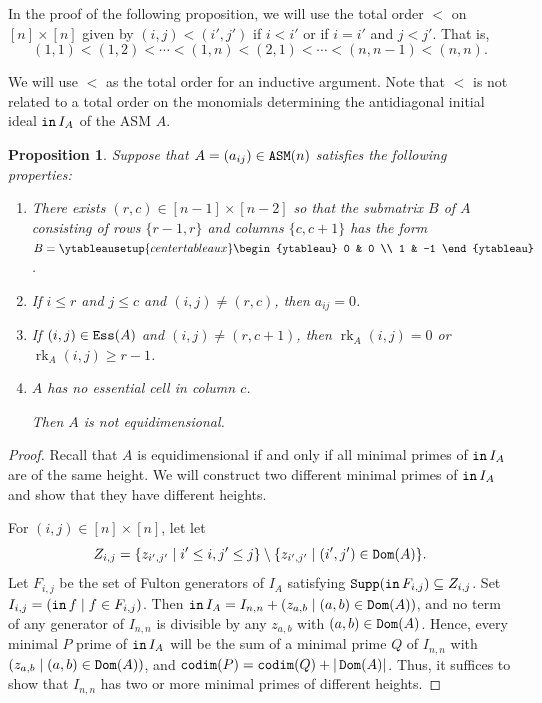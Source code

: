 \documentclass[12 pt]{amsart}
\DeclareMathOperator{\ASM}{{\tt ASM}}
\DeclareMathOperator{\init}{{\tt in}}
\DeclareMathOperator{\supp}{{\tt Supp}}
\DeclareMathOperator{\codim}{{\tt codim}}
\DeclareMathOperator{\ess}{{\tt Ess}}
\DeclareMathOperator{\Dom}{{\tt Dom}}
\DeclareMathOperator{\rk}{rk}
\theoremstyle{plain}
\newtheorem{prop}[thm]{Proposition}
\theoremstyle{definition}
\theoremstyle{remark}
\begin{document}
{In the proof of the following proposition, we will use the total order $<$ on $[n] \times [n]$ given by $(i,j) < (i',j')$ if $i < i'$ or if $i = i'$ and $j < j'$.  That is, \[
(1,1) < (1,2) < \cdots < (1,n) < (2,1) < \cdots < (n,n-1) < (n,n).
\]

We will use $<$ as the total order for an inductive argument.  Note that $<$ is not related to a total order on the monomials determining the antidiagonal initial ideal $\init I_A$ of the ASM $A$.

\begin{prop}\label{prop:not-equidimensional}
Suppose that $A = (a_{ij}) \in \ASM(n)$ satisfies the following properties:

\begin{enumerate}
    \item There exists $(r,c) \in [n-1] \times [n-2]$ so that the submatrix $B$ of $A$ consisting of rows $\{r-1,r\}$ and columns $\{c,c+1\}$ has the form $B = \ytableausetup{centertableaux}
\begin{ytableau}
 0 & 0 \\
1 & -1
\end{ytableau}$.
    
    \item  If $i \leq r$ and $j \leq c$ and $(i,j) \neq (r,c)$, then $a_{ij} = 0$.
    
    \item If $(i,j) \in \ess(A)$ and $(i,j) \neq (r,c+1)$, then $\rk_A(i,j) = 0$ or $\rk_A(i,j) \geq r-1$.
    
    \item $A$ has no essential cell in column $c$.
    
Then $A$ is not equidimensional.
\end{enumerate}
\label{prop:badblock}
\end{prop}

\begin{proof}
Recall that $A$ is equidimensional if and only if all minimal primes of $\init I_A$ are of the same height.  We will construct two different minimal primes of $\init I_A$ and show that they have different heights.

For $(i,j) \in [n] \times [n]$, let let \[
Z_{i,j} = \{z_{i',j'} \mid i' \leq i, j' \leq j\} \setminus \{z_{i',j'} \mid (i',j')\in \Dom(A)\}.
\] Let $F_{i,j}$ be the set of Fulton generators of $I_A$ satisfying $\supp(\init F_{i,j}) \subseteq Z_{i,j}$.  Set $I_{i,j} = (\init f \mid f \in F_{i,j})$. 
Then $\init I_A = I_{n,n}+(z_{a,b} \mid (a,b) \in \Dom(A))$, and no term of any generator of $I_{n,n}$ is divisible by any $z_{a,b}$ with $(a,b) \in \Dom(A)$. Hence, every minimal $P$ prime of $\init I_A$ will be the sum of a minimal prime $Q$ of $I_{n,n}$ with $(z_{a,b} \mid (a,b) \in \Dom(A))$, and $\codim(P) = \codim(Q)+|\Dom(A)|$. Thus, it suffices to show that $I_{n,n}$ has two or more minimal primes of different heights.


\end{proof}}
\end{document}
